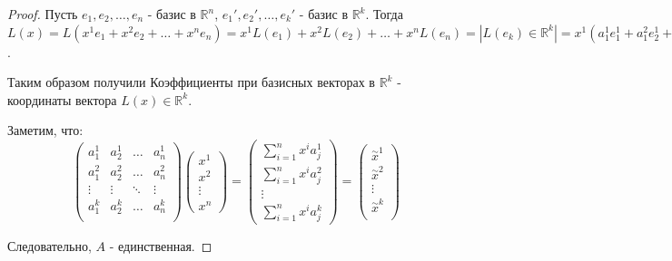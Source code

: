 \documentclass{report}
\theoremstyle{definition}
\begin{document}
\begin{proof}
  Пусть $e_1,e_2,\ldots,e_n$ - базис в $\mathbb{R}^n$, $e_1',e_2',\ldots,e_k'$ - базис в $\mathbb{R}^k$.
  Тогда $L(x) = L(x^1e_1 + x^2e_2 + \ldots + x^ne_n) = x^1 L(e_1) + x^2 L(e_2) + \ldots + x^n L(e_n) =
    \left|
    L(e_k) \in \mathbb{R}^k
    \right| = x^1 (a_1^1e^1_1 + a^2_1e_2^1 + \ldots + a_1^ke_k^1) + x^2(a_2^1e_1^1 + a^2_2e_2^1 + \ldots +
    a^k_2e_k^1) + \ldots + x^n (a^1_n e_1^1 + a^2_n e_2^1 + \ldots + a_n^k e^1_k) = (\sum_{i=1}^{n}x^i
    a_i^1)e_1' + (\sum_{i=1}^{n}x^ia_i^2)e_2' + \ldots + (\sum_{i=1}^{n}x^i a_i^k)e_k'$.

  Таким образом получили Коэффициенты при базисных векторах в $\mathbb{R}^k$ - координаты вектора $L(x)\in
    \mathbb{R}^k$.

  Заметим, что:
  \begin{equation*}
    \left(
    \begin{array}{cccc}
      a^1_1  & a_2^1  & \ldots & a_n^1  \\
      a^2_1  & a_2^2  & \ldots & a_n^2  \\
      \vdots & \vdots & \ddots & \vdots \\
      a^k_1  & a_2^k  & \ldots & a_n^k  \\
    \end{array}
    \right)\left(
    \begin{array}{c}
      x^1    \\
      x^2    \\
      \vdots \\
      x^n
    \end{array}
    \right) = \left(
    \begin{array}{c}
      \sum_{i=1}^{n}x^i a^1_j \\
      \sum_{i=1}^{n}x^i a^2_j \\
      \vdots                  \\
      \sum_{i=1}^{n}x^i a^k_j
    \end{array}
    \right) = \left(
    \begin{array}{c}
      \overset{\sim}{x}^1 \\
      \overset{\sim}{x}^2 \\
      \vdots              \\
      \overset{\sim}{x}^k \\
    \end{array}
    \right)
  \end{equation*}

  Следовательно, $A$ - единственная.
\end{proof}
\end{document}
